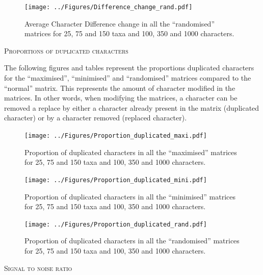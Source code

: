 \documentclass[12pt,letterpaper]{article}
\renewcommand{\section}[1]{%
\bigskip
\begin{center}
\begin{Large}
\normalfont\scshape #1
\medskip
\end{Large}
\end{center}}
\begin{document}
\begin{figure}[!htbp]
\centering
   \texttt{[image: ../Figures/Difference\_change\_rand.pdf]}
\caption{Average Character Difference change in all the ``randomised'' matrices for 25, 75 and 150 taxa and 100, 350 and 1000 characters.}
\end{figure}




\newpage

\section{Proportions of duplicated characters}

The following figures and tables represent the proportions duplicated characters for the ``maximised'', ``minimised'' and ``randomised'' matrices compared to the ``normal'' matrix. This represents the amount of character modified in the matrices. In other words, when modifying the matrices, a character can be removed a replace by either a character already present in the matrix (duplicated character) or by a character removed (replaced character).

\begin{figure}[!htbp]
\centering
   \texttt{[image: ../Figures/Proportion\_duplicated\_maxi.pdf]}
\caption{Proportion of duplicated characters in all the ``maximised'' matrices for 25, 75 and 150 taxa and 100, 350 and 1000 characters.}
\end{figure}

\begin{figure}[!htbp]
\centering
   \texttt{[image: ../Figures/Proportion\_duplicated\_mini.pdf]}
\caption{Proportion of duplicated characters in all the ``minimised'' matrices for 25, 75 and 150 taxa and 100, 350 and 1000 characters.}
\end{figure}

\begin{figure}[!htbp]
\centering
   \texttt{[image: ../Figures/Proportion\_duplicated\_rand.pdf]}
\caption{Proportion of duplicated characters in all the ``randomised'' matrices for 25, 75 and 150 taxa and 100, 350 and 1000 characters.}
\end{figure}





\newpage

\section{Signal to noise ratio}
\end{document}
